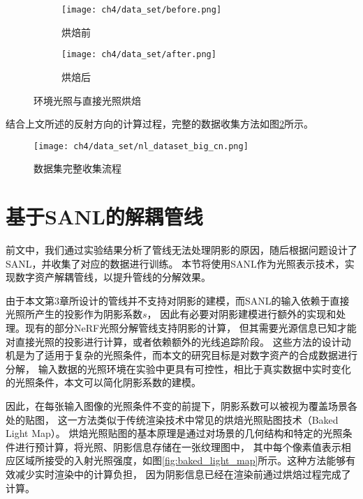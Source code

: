 \begin{figure}[H]
  \centering
  \begin{subfigure}[t]{0.42\textwidth}
    \centering
    \texttt{[image: ch4/data\_set/before.png]}
    \caption{烘焙前}
  \end{subfigure}
  \begin{subfigure}[t]{0.42\textwidth}
    \centering
    \texttt{[image: ch4/data\_set/after.png]}
    \caption{烘焙后}
  \end{subfigure}
  \caption{环境光照与直接光照烘焙}
  \label{fig:light_baking}
\end{figure}
结合上文所述的反射方向的计算过程，完整的数据收集方法如图\ref{fig:full_pipe}所示。
\begin{figure}[htb]
  \centering
  \texttt{[image: ch4/data\_set/nl\_dataset\_big\_cn.png]}
  \caption{数据集完整收集流程}
  \label{fig:full_pipe}
\end{figure}

\section{基于SANL的解耦管线}

前文中，我们通过实验结果分析了管线无法处理阴影的原因，随后根据问题设计了SANL，并收集了对应的数据进行训练。
本节将使用SANL作为光照表示技术，实现数字资产解耦管线，以提升管线的分解效果。

由于本文第3章所设计的管线并不支持对阴影的建模，而SANL的输入依赖于直接光照所产生的投影作为阴影系数$s$，
因此有必要对阴影建模进行额外的实现和处理。现有的部分NeRF光照分解管线支持阴影的计算，
但其需要光源信息已知才能对直接光照的投影进行计算，或者依赖额外的光线追踪阶段。
这些方法的设计动机是为了适用于复杂的光照条件，而本文的研究目标是对数字资产的合成数据进行分解，
输入数据的光照环境在实验中更具有可控性，相比于真实数据中实时变化的光照条件，本文可以简化阴影系数的建模。

因此，在每张输入图像的光照条件不变的前提下，阴影系数可以被视为覆盖场景各处的贴图，
这一方法类似于传统渲染技术中常见的烘焙光照贴图技术（Baked Light Map）。
烘焙光照贴图的基本原理是通过对场景的几何结构和特定的光照条件进行预计算，将光照、阴影信息存储在一张纹理图中，
其中每个像素值表示相应区域所接受的入射光照强度，如图\ref{fig:baked_light_map}所示。这种方法能够有效减少实时渲染中的计算负担，
因为阴影信息已经在渲染前通过烘焙过程完成了计算。

